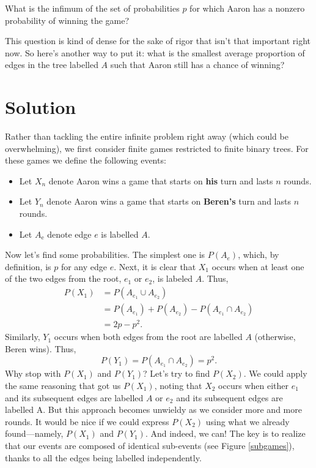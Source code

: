\documentclass{book}
\begin{document}
\begin{question*}\label{infimum}
What is the infimum of the set of probabilities $p$ for which Aaron has a nonzero probability of winning the game?
\end{question*}
This question is kind of dense for the sake of rigor that isn't that important right now. So here's another way to put it: what is the smallest average proportion of edges in the tree labelled $A$ such that Aaron still has a chance of winning?

\chapter{Solution}\label{solution}
Rather than tackling the entire infinite problem right away (which could be overwhelming), we first consider finite games restricted to finite binary trees. For these games we define the following events:
\begin{itemize}
\item Let $X_n$ denote Aaron wins a game that starts on \textbf{his} turn and lasts $n$ rounds.
\item Let $Y_n$ denote Aaron wins a game that starts on \textbf{Beren's} turn and lasts $n$ rounds.
\item Let $A_{\text{e}}$ denote edge $e$ is labelled $A$.
\end{itemize}
Now let's find some probabilities. The simplest one is $P(A_{e})$, which, by definition, is $p$ for any edge $e$. Next, it is clear that $X_1$ occurs when at least one of the two edges from the root, $e_1$ or $e_2$, is labeled $A$. Thus,
\begin{align*}
P(X_1) &= P(A_{e_1} \cup A_{e_2})\\
&= P(A_{e_1}) + P(A_{e_2})- P(A_{e_1} \cap A_{e_2})\\
&= 2p - p^2.
\end{align*}
Similarly, $Y_1$ occurs when both edges from the root are labelled $A$ (otherwise, Beren wins). Thus,
\[P(Y_1) = P(A_{e_1} \cap A_{e_2}) = p^2.\]
Why stop with $P(X_1)$ and $P(Y_1)$? Let's try to find $P(X_2)$. We could apply the same reasoning that got us $P(X_1)$, noting that $X_2$ occurs when either $e_1$ and its subsequent edges are labelled $A$ or $e_2$ and its subsequent edges are labelled A. But this approach becomes unwieldy as we consider more and more rounds. It would be nice if we could express $P(X_2)$ using what we already found---namely, $P(X_1)$ and $P(Y_1)$. And indeed, we can! The key is to realize that our events are composed of identical sub-events (see Figure \ref{subgames}), thanks to all the edges being labelled independently.
\end{document}
